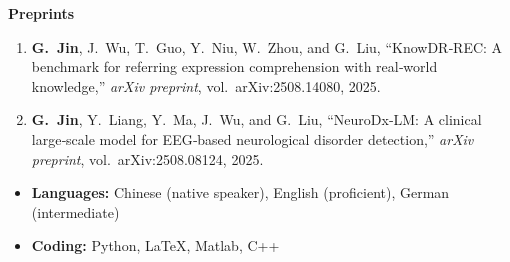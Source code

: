 \documentclass[10pt,a4paper,withhyper]{altacv}
\begin{document}
\vspace{1em}

\textbf{Preprints}
\begin{enumerate}[leftmargin=0.5cm,label=\raisebox{0pt}{\textcolor{PastelRed}{\large\bfseries\arabic*}},itemsep=0.5em]
  \item \textbf{G.~Jin}, J.~Wu, T.~Guo, Y.~Niu, W.~Zhou, and G.~Liu, ``KnowDR‑REC: A benchmark for referring expression comprehension with real‑world knowledge,'' \emph{arXiv preprint}, vol.~arXiv:2508.14080, 2025.
  \item \textbf{G.~Jin}, Y.~Liang, Y.~Ma, J.~Wu, and G.~Liu, ``NeuroDx‑LM: A clinical large‑scale model for EEG‑based neurological disorder detection,'' \emph{arXiv preprint}, vol.~arXiv:2508.08124, 2025.
\end{enumerate}


\begin{itemize}
  \item \textbf{Languages:} Chinese (native speaker), English (proficient), German (intermediate)
  \item \textbf{Coding:} Python, \LaTeX, Matlab, C++
\end{itemize}

\end{document}
